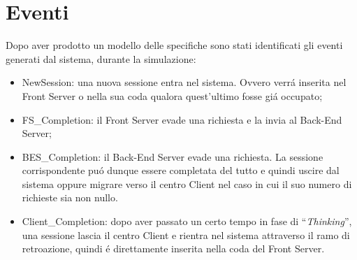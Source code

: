 \section{Eventi}
Dopo aver prodotto un modello delle specifiche sono stati identificati gli eventi generati dal sistema, durante la simulazione:
\begin{itemize}
\item NewSession: una nuova sessione entra nel sistema. Ovvero verr\'a inserita nel Front Server o nella sua coda qualora quest'ultimo fosse gi\'a occupato;
\item FS\_Completion: il Front Server evade una richiesta e la invia al Back-End Server;
\item BES\_Completion: il Back-End Server evade una richiesta. La sessione corrispondente pu\'o dunque essere completata del tutto e quindi uscire dal sistema oppure migrare verso il centro Client nel caso in cui il suo numero di richieste sia non nullo.
\item Client\_Completion: dopo aver passato un certo tempo in fase di “\textit{Thinking}”, una sessione lascia il centro Client e rientra nel sistema attraverso il ramo di retroazione, quindi \'e direttamente inserita nella coda del Front Server.
\end{itemize}
